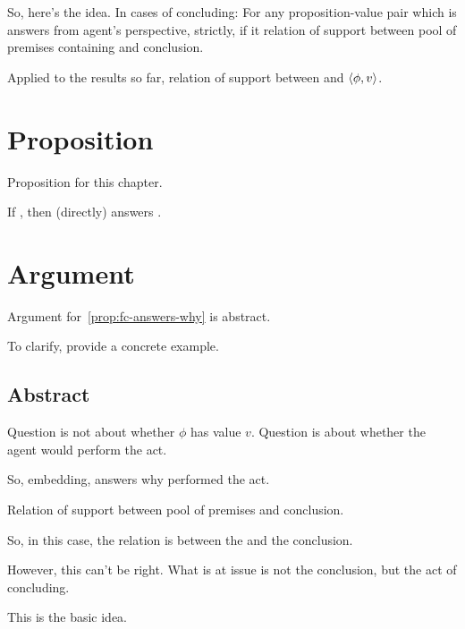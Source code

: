 \begin{note}
  So, here's the idea.
  In cases of concluding:
  For any proposition-value pair which is answers from agent's perspective, strictly,
  if it relation of support between pool of premises containing and conclusion.
\end{note}

\begin{note}
  Applied to the results so far, relation of support between \fc{} and \(\langle \phi, v \rangle\).
\end{note}

\section{Proposition}
\label{cha:fc-why:sec:proposition}

\begin{note}
  Proposition for this chapter.

  \begin{proposition}
    \label{prop:fc-answers-why}
    If \requ{}, then \fc{} (directly) answers \qWhy{}.
  \end{proposition}
\end{note}

\section{Argument}
\label{cha:fc-why:sec:argument}

\begin{note}
  Argument for~\autoref{prop:fc-answers-why} is abstract.

  To clarify, provide a concrete example.
\end{note}

\subsection{Abstract}
\label{cha:fc-why:sec:argument:abstract}

\begin{note}
  \color{red}
  Question is not about whether \(\phi\) has value \(v\).
  Question is about whether the agent would perform the act.

  So, embedding, answers why performed the act.

  Relation of support between pool of premises and conclusion.

  So, in this case, the relation is between the \fc{} and the conclusion.

  However, this can't be right.
  What is at issue is not the conclusion, but the act of concluding.

  This is the basic idea.
\end{note}

